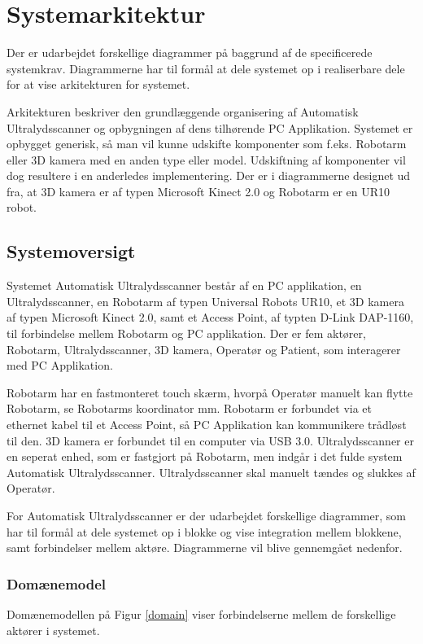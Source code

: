 \chapter{Systemarkitektur}\label{Systemarkitektur}
Der er udarbejdet forskellige diagrammer på baggrund af de specificerede systemkrav.  Diagrammerne har til formål at dele systemet op i realiserbare dele for at vise arkitekturen for systemet. 

Arkitekturen beskriver den grundlæggende organisering af Automatisk Ultralydsscanner og opbygningen af dens tilhørende PC Applikation. Systemet er opbygget generisk, så man vil kunne udskifte komponenter som f.eks. Robotarm eller 3D kamera med en anden type eller model. Udskiftning af komponenter vil dog resultere i en anderledes implementering. Der er i diagrammerne designet ud fra, at 3D kamera er af typen Microsoft Kinect 2.0 og Robotarm er en UR10 robot. 

\section{Systemoversigt}
Systemet Automatisk Ultralydsscanner består af en PC applikation, en Ultralydsscanner, en Robotarm af typen Universal Robots UR10, et 3D kamera af typen Microsoft Kinect 2.0, samt et Access Point, af typten D-Link DAP-1160, til forbindelse mellem Robotarm og PC applikation. Der er fem aktører, Robotarm, Ultralydsscanner, 3D kamera, Operatør og Patient, som interagerer med PC Applikation.

Robotarm har en fastmonteret touch skærm, hvorpå Operatør manuelt kan flytte Robotarm, se Robotarms koordinator mm. Robotarm er forbundet via et ethernet kabel til et Access Point, så PC Applikation kan kommunikere trådløst til den. 3D kamera er forbundet til en computer via USB 3.0. Ultralydsscanner er en seperat enhed, som er fastgjort på Robotarm, men indgår i det fulde system Automatisk Ultralydsscanner. Ultralydsscanner skal manuelt tændes og slukkes af Operatør.

For Automatisk Ultralydsscanner er der udarbejdet forskellige diagrammer, som har til formål at dele systemet op i blokke og vise integration mellem blokkene, samt forbindelser mellem aktøre. Diagrammerne vil blive gennemgået nedenfor. 
\newpage

\subsection{Domænemodel}
Domænemodellen på Figur \ref{domain} viser forbindelserne mellem de forskellige aktører i systemet. 

